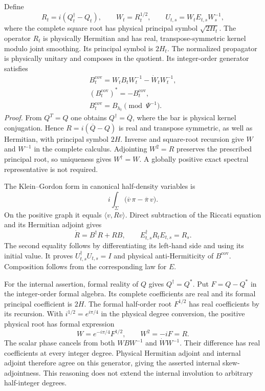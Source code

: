 \documentclass[
  english,
  11pt,
  reqno]{amsart}
\begin{document}
Define%
 \[
R_t=i(Q_t^\dagger-Q_t),\qquad
W_t=R_t^{1/2},\qquad
U_{t,s}=W_tE_{t,s}W_s^{-1},
\] where the complete square root has physical principal symbol
\(\sqrt{2H_t}\). The operator \(R_t\) is physically Hermitian and has
real, transpose-symmetric kernel modulo joint smoothing. Its principal
symbol is \(2H_t\). The normalized propagator is physically unitary and
composes in the quotient. Its integer-order generator satisfies%
 \[
\begin{gathered}
B_t^{\mathrm{cov}}
=W_tB_tW_t^{-1}-\dot W_tW_t^{-1}, \\
(B_t^{\mathrm{cov}})^*=-B_t^{\mathrm{cov}}, \\
B_t^{\mathrm{cov}}=B_{h_t}\pmod{\Psi^{-1}}.
\end{gathered}
\] \emph{Proof.} From \(Q^T=Q\) one obtains \(Q^\dagger=\overline Q\),
where the bar is physical kernel conjugation. Hence
\(R=i(\overline Q-Q)\) is real and transpose symmetric, as well as
Hermitian, with principal symbol \(2H\). Inverse and square-root
recursion give \(W\) and \(W^{-1}\) in the complete calculus. Adjointing
\(W^2=R\) preserves the prescribed principal root, so uniqueness gives
\(W^\dagger=W\). A globally positive exact spectral representative is
not required.

The Klein--Gordon form in canonical half-density variables is%
 \[
i\int_\Sigma
\bigl(\overline v\,\pi-\overline\pi\,v\bigr).
\] On the positive graph it equals \(\langle v,Rv\rangle\). Direct
subtraction of the Riccati equation and its Hermitian adjoint gives%
 \[
\dot R=B^\dagger R+RB,
\qquad
E_{t,s}^\dagger R_tE_{t,s}=R_s.
\] The second equality follows by differentiating its left-hand side and
using its initial value. It proves \(U_{t,s}^\dagger U_{t,s}=I\) and
physical anti-Hermiticity of \(B^{\mathrm{cov}}\). Composition follows
from the corresponding law for \(E\).

For the internal assertion, formal reality of \(Q\) gives
\(Q^\dagger=Q^*\). Put \(F=Q-Q^*\) in the integer-order formal algebra.
Its complete coefficients are real and its formal principal coefficient
is \(2H\). The formal half-order root \(F^{1/2}\) has real coefficients
by its recursion. With \(i^{1/2}=e^{i\pi/4}\) in the physical degree
conversion, the positive physical root has formal expression%
 \[
W=e^{-i\pi/4}F^{1/2},\qquad
W^2=-iF=R.
\] The scalar phase cancels from both \(WBW^{-1}\) and
\(\dot W W^{-1}\). Their difference has real coefficients at every
integer degree. Physical Hermitian adjoint and internal adjoint
therefore agree on this generator, giving the asserted internal
skew-adjointness. This reasoning does not extend the internal involution
to arbitrary half-integer degrees.
\end{document}
